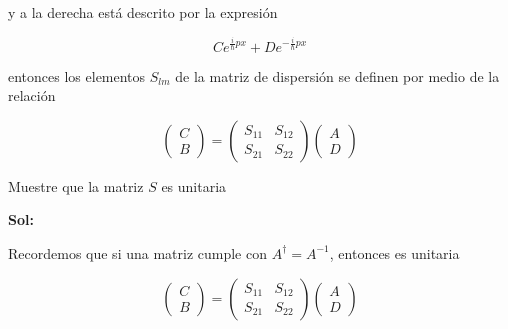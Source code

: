\documentclass[12pt,a4paper]{article}
\begin{document}
\begin{enumerate}
    y a la derecha está descrito por la expresión
    
    \begin{equation*}
        C e^{\frac{i}{\hbar}px} + D e^{-\frac{i}{\hbar}px}
    \end{equation*}
    
    entonces los elementos $S_{lm}$ de la matriz de dispersión se definen por medio de la relación
    
    \begin{equation*}
        \left(\begin{matrix}
         C \\
         B
        \end{matrix}\right) =  \left(\begin{matrix}
         S_{11} & S_{12} \\
         S_{21} & S_{22}
        \end{matrix}\right)
        \left(\begin{matrix}
         A \\
         D
        \end{matrix}\right)
    \end{equation*}
    
    Muestre que la matriz $S$ es unitaria
    
    \textbf{Sol:}
    
    Recordemos que si una matriz cumple con $A^{\dagger} = A^{-1}$, entonces es unitaria
    
    \begin{equation*}
        \left(\begin{matrix}
         C \\
         B
        \end{matrix}\right) =  \left(\begin{matrix}
         S_{11} & S_{12} \\
         S_{21} & S_{22}
        \end{matrix}\right)
        \left(\begin{matrix}
         A \\
         D
        \end{matrix}\right)
    \end{equation*}
    

\end{enumerate}
\end{document}
